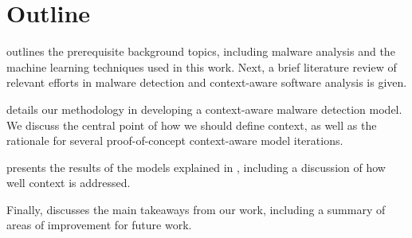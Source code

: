\documentclass[../stegner_thesis.tex]{subfiles}
\begin{document}
\section{Outline}%
\label{sec:intro_outline}

\par {} outlines the prerequisite background topics,
including malware analysis and the machine learning techniques used in this
work.
Next, a brief literature review of relevant efforts in malware detection and
context-aware software analysis is given.

\par {} details our methodology in developing a context-aware
malware detection model.
We discuss the central point of how we should define context, as well as the
rationale for several proof-of-concept context-aware model iterations.

\par {} presents the results of the models explained in
, including a discussion of how well context is addressed.

\par Finally,  discusses the main takeaways from our work,
including a summary of areas of improvement for future work.

\newpage
\end{document}
